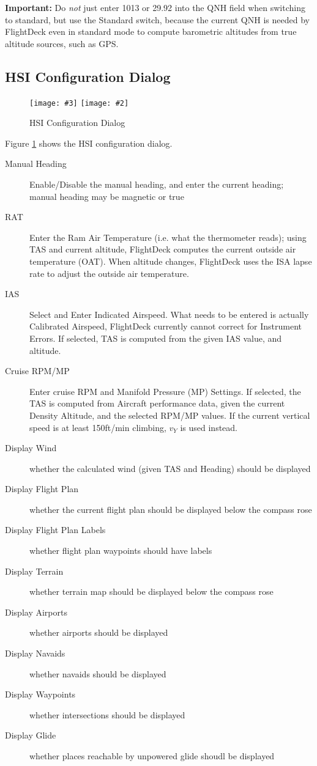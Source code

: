 \documentclass[a4paper,10pt,pdftex]{article}
\newcommand{\jnxfig}[3][]{\ifmypdf\texttt{[image: \#3]}
  \else\texttt{[image: \#2]}\fi}
\begin{document}
{\bf Important:} Do \emph{not} just enter 1013 or 29.92 into the QNH
field when switching to standard, but use the Standard switch, because
the current QNH is needed by FlightDeck even in standard mode to
compute barometric altitudes from true altitude sources, such as GPS.

\subsection{HSI Configuration Dialog}

\begin{figure}[!htbp]
  \begin{center}
    \jnxfig[scale=0.5]{hsicfgdlg.eps}{hsicfgdlg.png}
    \caption{HSI Configuration Dialog}
    \label{fig:hsicfgdlg}
  \end{center}
\end{figure}

Figure \ref{fig:hsicfgdlg} shows the HSI configuration dialog.

\begin{description}
\item[Manual Heading] Enable/Disable the manual heading, and enter the
  current heading; manual heading may be magnetic or true
\item[RAT] Enter the Ram Air Temperature (i.e. what the thermometer
  reads); using TAS and current altitude, FlightDeck computes the
  current outside air temperature (OAT). When altitude changes, FlightDeck
  uses the ISA lapse rate to adjust the outside air temperature.
\item[IAS] Select and Enter Indicated Airspeed. What needs to be
  entered is actually Calibrated Airspeed, FlightDeck currently cannot
  correct for Instrument Errors. If selected, TAS is computed from the
  given IAS value, and altitude.
\item[Cruise RPM/MP] Enter cruise RPM and Manifold Pressure (MP)
  Settings. If selected, the TAS is computed from Aircraft performance
  data, given the current Density Altitude, and the selected RPM/MP
  values. If the current vertical speed is at least 150ft/min
  climbing, $v_Y$ is used instead.
\item[Display Wind] whether the calculated wind (given TAS and
  Heading) should be displayed
\item[Display Flight Plan] whether the current flight plan should be
  displayed below the compass rose
\item[Display Flight Plan Labels] whether flight plan waypoints should
  have labels
\item[Display Terrain] whether terrain map should be displayed below
  the compass rose
\item[Display Airports] whether airports should be displayed
\item[Display Navaids] whether navaids should be displayed
\item[Display Waypoints] whether intersections should be displayed
\item[Display Glide] whether places reachable by unpowered glide
  shoudl be displayed
\end{description}
\end{document}
